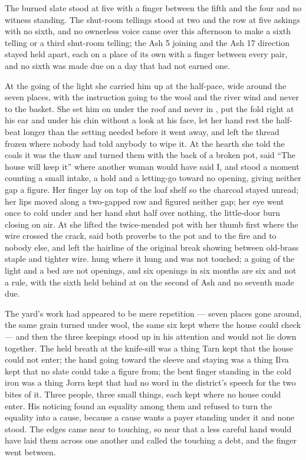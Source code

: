 The burned slate stood at five with a finger between the fifth and the four and no witness standing. The shut-room tellings stood at two and the row at five askings with no sixth, and no ownerless voice came over  this afternoon to make a sixth telling or a third shut-room telling; the Ash 5 joining and the Ash 17 direction stayed held apart, each on a place of its own with a finger between every pair, and no sixth was made due on a day that had not earned one.

\scenebreak

At the going of the light she carried him up at the half-pace, wide around the seven places, with the instruction going to the wool and the river wind and never to the basket. She set him on  under the roof and never in , put the fold right at his ear and under his chin without a look at his face, let her hand rest the half-beat longer than the setting needed before it went away, and left the thread frozen where nobody had told anybody to wipe it. At the hearth she told the coals it was the thaw and turned them with the back of a broken pot, said “The house will keep it” where another woman would have said I, and stood a moment counting a small intake, a hold and a letting-go toward no opening, giving neither gap a figure. Her finger lay on top of the loaf shelf so the charcoal stayed unread; her lips moved along a two-gapped row and figured neither gap; her eye went once to  cold under  and her hand shut half over nothing, the little-door burn closing on air. At  she lifted the twice-mended pot with her thumb first where the wire crossed the crack, said both proverbs to the pot and to the fire and to nobody else, and left the hairline of the original break showing between old-brass staple and tighter wire.  hung where it hung and was not touched; a going of the light and a bed are not openings, and six openings in six months are six and not a rule, with the sixth held behind at  on the second of Ash and no seventh made due.

The yard’s work had appeared to be mere repetition --- seven places gone around, the same grain turned under wool, the same six kept where the house could check --- and then the three keepings stood up in his attention and would not lie down together. The held breath at the knife-sill was a thing Tarn kept that the house could not enter; the hand going toward the sleeve and staying was a thing Ilva kept that no slate could take a figure from; the bent finger standing in the cold iron was a thing Jorra kept that had no word in the district’s speech for the two bites of it. Three people, three small things, each kept where no house could enter. His noticing found an equality among them and refused to turn the equality into a cause, because a cause wants a payer standing under it and none stood. The edges came near to touching, so near that a less careful hand would have laid them across one another and called the touching a debt, and the finger went between.

